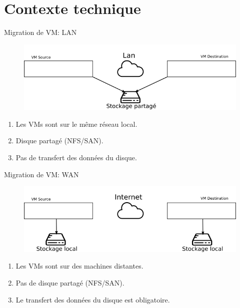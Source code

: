 \documentclass{libs/XJTLU_format}
\begin{document}
\section{Contexte technique}
\begin{frame}{Migration de VM: LAN}
    \begin{figure}
        \centering
        \includegraphics[scale=0.5]{images/lan.png}
    \end{figure}
    \begin{enumerate}
        \item Les VMs sont sur le même réseau local.
        \item Disque partagé (NFS/SAN).
        \item Pas de transfert des données du disque.
    \end{enumerate}
\end{frame}

\begin{frame}{Migration de VM: WAN}
    \begin{figure}
        \centering
        \includegraphics[scale=0.5]{images/wan.png}
    \end{figure}
    \begin{enumerate}
        \item Les VMs sont sur des machines distantes.
        \item Pas de disque partagé (NFS/SAN).
        \item Le transfert des données du disque est obligatoire.
    \end{enumerate}
\end{frame}
\end{document}
